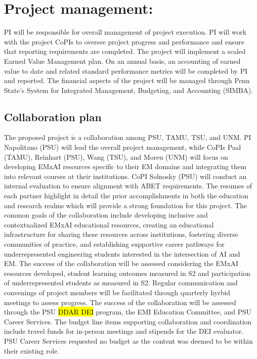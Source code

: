 \documentclass[11pt]{article}
\begin{document}
\section{Project management:}
PI will be responsible for overall management of project execution.  PI will work with the project CoPIs to oversee project progress and performance and ensure that reporting requirements are completed.  The project will implement a scaled Earned Value Management plan. On an annual basis, an accounting of earned value to date and related standard performance metrics will be completed by PI and reported. The financial aspects of the project will be managed through Penn State’s System for Integrated Management, Budgeting, and Accounting (SIMBA). 


\subsection{Collaboration plan}
The proposed project is a collaboration among PSU, TAMU, TSU, and UNM. PI Napolitano (PSU) will lead the overall project management, while CoPIs Paal (TAMU), Reinhart (PSU), Wang (TSU), and Moreu (UNM) will focus on developing EMxAI resources specific to their EM domains and integrating them into relevant courses at their institutions. CoPI Solnosky (PSU) will conduct an internal evaluation to ensure alignment with ABET requirements.
The resumes of each partner highlight in detail the prior accomplishments in both the education and research realms which will provide a strong foundation for this project. 
The common goals of the collaboration include developing inclusive and contextualized EMxAI educational resources, creating an educational infrastructure for sharing these resources across institutions, fostering diverse communities of practice, and establishing supportive career pathways for underrepresented engineering students interested in the intersection of AI and EM. 
The success of the collaboration will be assessed considering the EMxAI resources developed, student learning outcomes measured in S2 and participation of underrepresented students as measured in S2.
Regular communication and convenings of project members will be facilitated through quarterly hyrbid meetings to assess progress. 
The success of the collaboration will be assessed through the PSU \hl{DDAR DEI} program, the EMI Education Committee, and PSU Career Services.
The budget line items supporting collaboration and coordination include travel funds for in-person meetings and stipends for the DEI evaluator.
PSU Career Services requested no budget as the content was deemed to be within their existing role.
\end{document}
